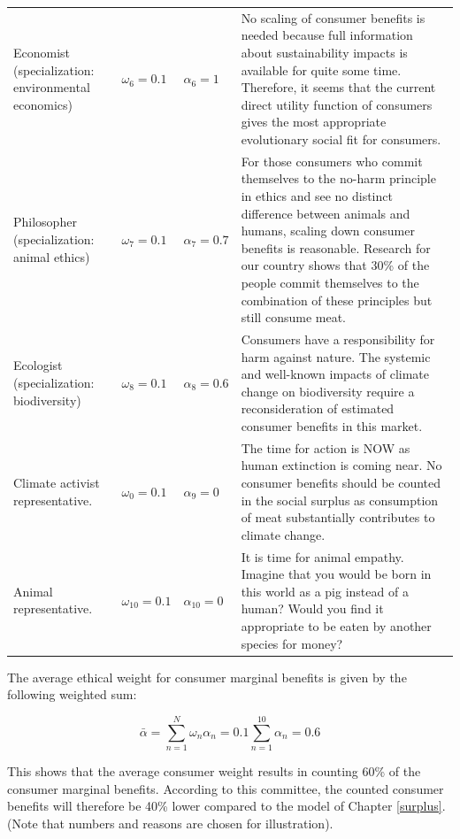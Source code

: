 \documentclass[
]{book}
\begin{document}
\begin{table}
\begin{tabular}[t]{llll}
\addlinespace
Economist (specialization: environmental economics) & $\omega_6 = 0.1$ & $\alpha_6 = 1$ & No scaling of consumer benefits is needed because full information about sustainability impacts is available for quite some time. Therefore, it seems that the current direct utility function of consumers gives the most appropriate evolutionary social fit for consumers.\\
Philosopher (specialization: animal ethics) & $\omega_7 = 0.1$ & $\alpha_7 = 0.7$ & For those consumers who commit themselves to the no-harm principle in ethics and see no distinct difference between animals and humans, scaling down consumer benefits is reasonable. Research for our country shows that 30\% of the people commit themselves to the combination of these principles but still consume meat.\\
Ecologist (specialization: biodiversity) & $\omega_8 = 0.1$ & $\alpha_8 = 0.6$ & Consumers have a responsibility for harm against nature. The systemic and well-known impacts of climate change on biodiversity require a reconsideration of estimated consumer benefits in this market.\\
Climate activist representative. & $\omega_0 = 0.1$ & $\alpha_9 = 0$ & The time for action is NOW as human extinction is coming near. No consumer benefits should be counted in the social surplus as consumption of meat substantially contributes to climate change.\\
Animal representative. & $\omega_{10} = 0.1$ & $\alpha_{10} = 0$ & It is time for animal empathy. Imagine that you would be born in this world as a pig instead of a human? Would you find it appropriate to be eaten by another species for money?\\
\bottomrule
\end{tabular}
\end{table}

The average ethical weight for consumer marginal benefits is given by the following weighted sum:

\begin{equation}
 \bar{\alpha} = \sum_{n=1}^N \omega_n \alpha_n = 0.1 \sum_{n=1}^{10} \alpha_n = 0.6
\end{equation}

This shows that the average consumer weight results in counting 60\% of the consumer marginal benefits. According to this committee, the counted consumer benefits will therefore be 40\% lower compared to the model of Chapter \ref{surplus}. (Note that numbers and reasons are chosen for illustration).
\end{document}
